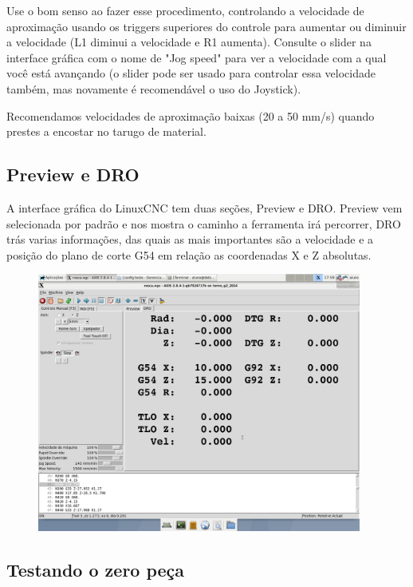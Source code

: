 \documentclass[twoside,a4paper]{refart}
\begin{document}
\attention Use o bom senso ao fazer esse procedimento, controlando a velocidade de aproximação usando os triggers superiores do controle para aumentar ou diminuir a velocidade (L1 diminui a velocidade e R1 aumenta). Consulte o slider na interface gráfica com o nome de "Jog speed" para ver a velocidade com a qual você está avançando (o slider pode ser usado para controlar essa velocidade também, mas novamente é recomendável o uso do Joystick). 

\attention Recomendamos velocidades de aproximação baixas (20 a 50 mm/s) quando prestes a encostar no tarugo de material.

\subsection{Preview e DRO}

A interface gráfica do LinuxCNC tem duas seções, Preview e DRO. Preview vem selecionada por padrão e nos mostra o caminho a ferramenta irá percorrer, DRO trás varias informações, das quais as mais importantes são a velocidade e a posição do plano de corte G54 em relação as coordenadas X e Z absolutas.

\begin{figure}[H]
    \begin{center}
        \includegraphics[width=0.95\textwidth]{imagens/configuracao_de_posicao.png}
    \end{center}
    \caption{}\label{fig:}
\end{figure}

\subsection{Testando o zero peça}
\end{document}
